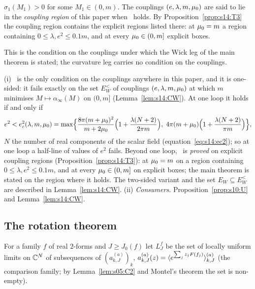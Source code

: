 \begin{hypothesis}\label{hyp:s03:T3}
$\sigma_1(M_1)>0$ for some $M_1\in(0,m)$. The couplings $(e,\lambda,m,\mu_0)$ are said to lie in the \emph{coupling region} of this paper when \Tthree\ holds. By Proposition~\ref{prop:s14:T3} the coupling region contains the explicit regions listed there: at $\mu_0=m$ a region containing $0\le\lambda,e^2\le0.1m$, and at every $\mu_0\in(0,m]$ explicit boxes.
\end{hypothesis}
This is the condition on the couplings under which the Wick leg of the main theorem is stated; the curvature leg carries no condition on the couplings.

\begin{remark}[on \Tthree]\label{rem:s03:T3}
(i) \Tthree\ is the only condition on the couplings anywhere in this paper, and it is one-sided: it fails exactly on the set $E^<_W$ of couplings $(e,\lambda,m,\mu_0)$ at which $m$ minimises $M\mapsto\alpha_\infty(M)$ on $(0,m]$ (Lemma~\ref{lem:s14:CW}). At one loop it holds if and only if
\[
e^2<e_c^2(\lambda,m,\mu_0)=\max\Bigl\{\frac{8\pi(m+\mu_0)^2}{m+2\mu_0}\Bigl(1+\frac{\lambda(N+2)}{2\pi m}\Bigr),\ 4\pi(m+\mu_0)\Bigl(1+\frac{\lambda(N+2)}{\pi m}\Bigr)\Bigr\},
\]
$N$ the number of real components of the scalar field (equation~\eqref{eq:s14:ec2}); so at one loop a half-line of values of $e^2$ fails. Beyond one loop, \Tthree\ is \emph{proved} on explicit coupling regions (Proposition~\ref{prop:s14:T3}): at $\mu_0=m$ on a region containing $0\le\lambda,e^2\le0.1m$, and at every $\mu_0\in(0,m]$ on explicit boxes; the main theorem is stated on the region where it holds. The two-sided variant and the set $E_W\subseteq E^<_W$ are described in Lemma~\ref{lem:s14:CW}.
(ii) \emph{Consumers.} Proposition~\ref{prop:s10:U} and Lemma~\ref{lem:s14:CW}.
\end{remark}

\subsection{The rotation theorem}

For a family $f$ of real $2$-forms and $J\ge J_0(f)$ let $L^f_J$ be the set of locally uniform limits on $\mathbb C^N$ of subsequences of $(a^{(a)}_{k,J})_k$, $a^{(a)}_{k,J}(z)=\langle e^{\sum_jz_jF(f_j)}\rangle^{(a)}_{k,J}$ (the comparison family; by Lemma~\ref{lem:s05:C2} and Montel's theorem the set is non-empty).

